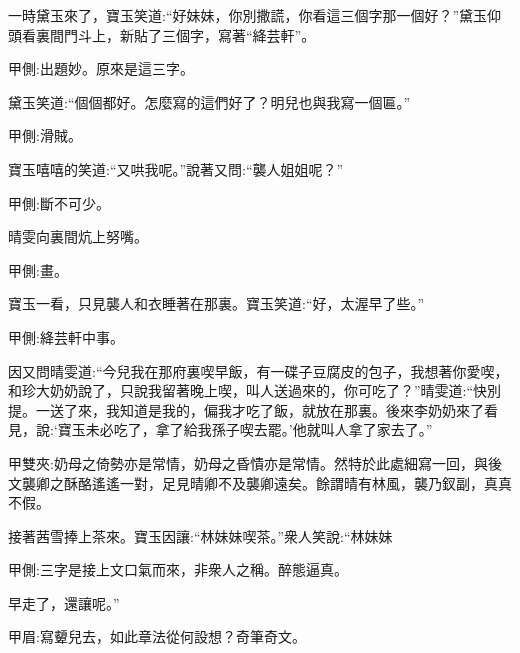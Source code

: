 \begin{parag}
    一時黛玉來了，寶玉笑道:“好妹妹，你別撒謊，你看這三個字那一個好？”黛玉仰頭看裏間門斗上，新貼了三個字，寫著“絳芸軒”。\begin{note}甲側:出題妙。原來是這三字。\end{note}黛玉笑道:“個個都好。怎麼寫的這們好了？明兒也與我寫一個匾。”\begin{note}甲側:滑賊。\end{note}寶玉嘻嘻的笑道:“又哄我呢。”說著又問:“襲人姐姐呢？”\begin{note}甲側:斷不可少。\end{note}晴雯向裏間炕上努嘴。\begin{note}甲側:畫。\end{note}寶玉一看，只見襲人和衣睡著在那裏。寶玉笑道:“好，太渥早了些。”\begin{note}甲側:絳芸軒中事。\end{note}因又問晴雯道:“今兒我在那府裏喫早飯，有一碟子豆腐皮的包子，我想著你愛喫，和珍大奶奶說了，只說我留著晚上喫，叫人送過來的，你可吃了？”晴雯道:“快別提。一送了來，我知道是我的，偏我才吃了飯，就放在那裏。後來李奶奶來了看見，說:‘寶玉未必吃了，拿了給我孫子喫去罷。’他就叫人拿了家去了。”\begin{note}甲雙夾:奶母之倚勢亦是常情，奶母之昏憒亦是常情。然特於此處細寫一回，與後文襲卿之酥酪遙遙一對，足見晴卿不及襲卿遠矣。餘謂晴有林風，襲乃釵副，真真不假。\end{note}接著茜雪捧上茶來。寶玉因讓:“林妹妹喫茶。”衆人笑說:“林妹妹\begin{note}甲側:三字是接上文口氣而來，非衆人之稱。醉態逼真。\end{note}早走了，還讓呢。”\begin{note}甲眉:寫顰兒去，如此章法從何設想？奇筆奇文。\end{note}
\end{parag}


